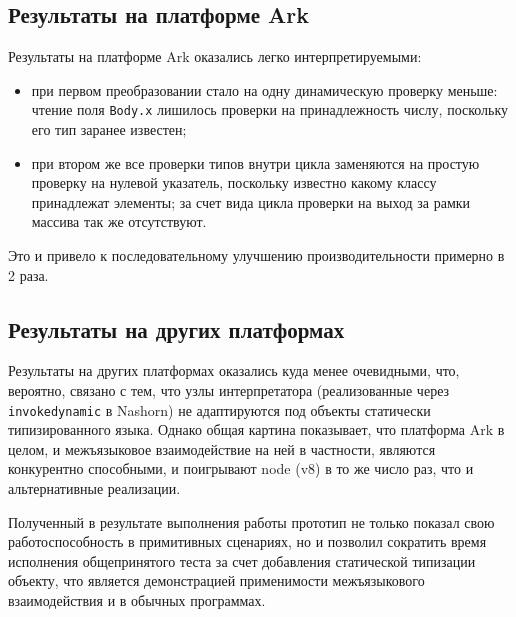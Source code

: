 \documentclass[times,specification,annotation]{itmo-student-thesis}
\begin{document}
\subsection{Результаты на платформе Ark}
Результаты на платформе Ark оказались легко интерпретируемыми:
\begin{itemize}
\item при первом преобразовании стало на одну динамическую проверку меньше: чтение поля \texttt{Body.x} лишилось проверки на принадлежность числу, поскольку его тип заранее известен;
\item при втором же все проверки типов внутри цикла заменяются на простую проверку на нулевой указатель, поскольку известно какому классу принадлежат элементы; за счет вида цикла проверки на выход за рамки массива так же отсутствуют.
\end{itemize}
Это и привело к последовательному улучшению производительности примерно в 2 раза.

\subsection{Результаты на других платформах}
Результаты на других платформах оказались куда менее очевидными, что, вероятно, связано с тем, что узлы интерпретатора (реализованные через \texttt{invokedynamic} в Nashorn) не адаптируются под объекты статически типизированного языка. Однако общая картина показывает, что платформа Ark в целом, и межъязыковое взаимодействие на ней в частности, являются конкурентно способными, и поигрывают node (v8) в то же число раз, что и альтернативные реализации.

\chapterconclusion
Полученный в результате выполнения работы прототип не только показал свою работоспособность в примитивных сценариях, но и позволил сократить время исполнения общепринятого теста за счет добавления статической типизации объекту, что является демонстрацией применимости межъязыкового взаимодействия и в обычных программах.
\end{document}
